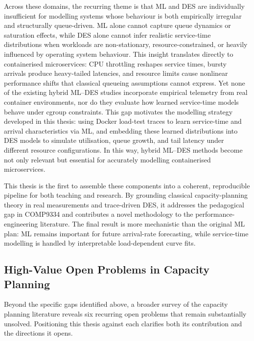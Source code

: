 Across these domains, the recurring theme is that ML and DES are
individually insufficient for modelling systems whose behaviour is both
empirically irregular and structurally queue-driven. ML alone cannot
capture queue dynamics or saturation effects, while DES alone cannot
infer realistic service-time distributions when workloads are
non-stationary, resource-constrained, or heavily influenced by operating
system behaviour. This insight translates directly to containerised
microservices: CPU throttling reshapes service times, bursty arrivals
produce heavy-tailed latencies, and resource limits cause nonlinear
performance shifts that classical queueing assumptions cannot express.
Yet none of the existing hybrid ML--DES studies incorporate empirical
telemetry from real container environments, nor do they evaluate how
learned service-time models behave under cgroup constraints. This gap
motivates the modelling strategy developed in this thesis: using Docker
load-test traces to learn service-time and arrival characteristics via
ML, and embedding these learned distributions into DES models to
simulate utilisation, queue growth, and tail latency under different
resource configurations. In this way, hybrid ML--DES methods become not
only relevant but essential for accurately modelling containerised
microservices.

This thesis is the first to assemble these components into a coherent, reproducible pipeline for both teaching and research. By grounding classical capacity-planning theory in real measurements and trace-driven DES, it addresses the pedagogical gap in COMP9334 and contributes a novel methodology to the performance-engineering literature. The final result is more mechanistic than the original ML plan: ML remains important for future arrival-rate forecasting, while service-time modelling is handled by interpretable load-dependent curve fits.

\subsection{High-Value Open Problems in Capacity Planning}

Beyond the specific gaps identified above, a broader survey of the capacity planning literature reveals six recurring open problems that remain substantially unsolved. Positioning this thesis against each clarifies both its contribution and the directions it opens.

